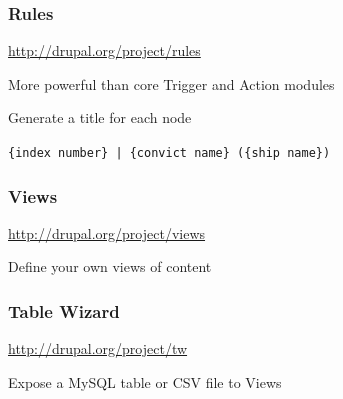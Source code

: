 \documentclass[ignorenonframetext,11pt]{beamer}
\begin{document}
\begin{frame}
\frametitle{Rules}
\label{rules}

\url{http://drupal.org/project/rules}


More powerful than core Trigger and Action modules


Generate a title for each node


\texttt{\{index number\} | \{convict name\} (\{ship name\})}



\end{frame}
		

\begin{frame}
\frametitle{Views}
\label{views}

\url{http://drupal.org/project/views}


Define your own views of content



\end{frame}
		

\begin{frame}
\frametitle{Table Wizard}
\label{tablewizard}

\url{http://drupal.org/project/tw}


Expose a MySQL table or CSV file to Views



\end{frame}
		
\end{document}
